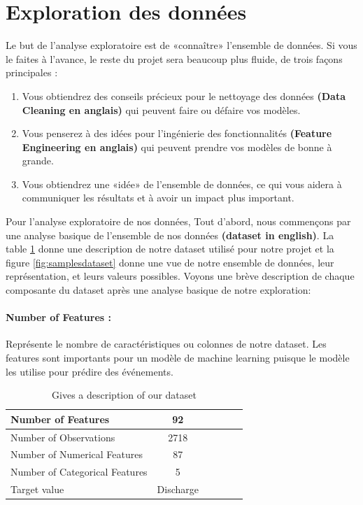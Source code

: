 \documentclass[12pt, french]{report}
\begin{document}
\section{Exploration des données}

Le but de l'analyse exploratoire est de «connaître» l'ensemble de données. Si vous le faites à l'avance, le reste du projet sera beaucoup plus fluide, de trois façons principales \cite{key20}:
\begin{enumerate}
\item Vous obtiendrez des conseils précieux pour le nettoyage des données \textbf{(Data Cleaning en anglais)} qui peuvent faire ou défaire vos modèles.
\item Vous penserez à des idées pour l'ingénierie des fonctionnalités \textbf{(Feature Engineering en anglais)} qui peuvent prendre vos modèles de bonne à grande.
\item Vous obtiendrez une «idée» de l'ensemble de données, ce qui vous aidera à communiquer les résultats et à avoir un impact plus important.
\end{enumerate}

Pour l'analyse exploratoire de nos données, Tout d'abord, nous commençons par une analyse basique de l'ensemble de nos données \textbf{(dataset in english)}. La table \ref{tab:dataset} donne une description de notre dataset utilisé pour notre projet et la figure \ref{fig:samplesdataset} donne une vue de notre ensemble de données, leur représentation, et leurs valeurs possibles. Voyons une brève description de chaque composante du dataset après une analyse basique de notre exploration:

\paragraph*{Number of Features :} Représente le nombre de caractéristiques ou colonnes de notre dataset. Les features sont importants pour un modèle de machine learning puisque le modèle les utilise pour prédire des événements. 



\begin{table}[h]
\centering
\begin{tabular}{|l|c|c|c|c|c|}
\hline
Number of Features & 92 \\
\hline
Number of Observations & 2718\\
\hline
Number of Numerical Features & 87\\
\hline
Number of Categorical Features & 5\\
\hline
Target value & Discharge\\
\hline

\end{tabular}
\caption{Gives a description of our dataset}
\label{tab:dataset}
\end{table}
\end{document}
